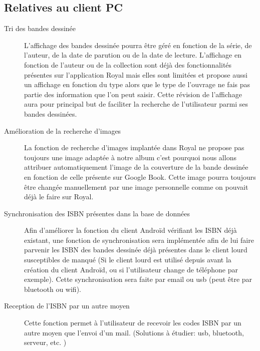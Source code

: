 \subsection{Relatives au client PC}
\begin{description}

\item[Tri des bandes dessinée]
	L'affichage des bandes dessinée pourra être géré en fonction de la série, de l'auteur, de la date de parution ou de la date de lecture. 
	L'affichage en fonction de l'auteur ou de la collection sont déjà des fonctionnalités présentes sur l'application Royal mais elles sont limitées et propose aussi un affichage en fonction du type alors que le type de l'ouvrage ne fais pas partie des information que l'on peut saisir. 
	Cette révision de l'affichage aura pour principal but de faciliter la recherche de l'utilisateur parmi ses bandes dessinées.

\item[Amélioration de la recherche d'images]
	La fonction de recherche d'images implantée dans Royal ne propose pas toujours une image adaptée à notre album c'est pourquoi nous allons attribuer automatiquement l'image de la couverture de la bande dessinée en fonction de celle présente sur Google Book. 
	Cette image pourra toujours être changée manuellement par une image personnelle comme on pouvait déjà le faire sur Royal.

\item[Synchronisation des ISBN présentes dans la base de données]
	Afin d'améliorer la fonction du client Androïd vérifiant les ISBN déjà existant, 
	une fonction de synchronisation sera implémentée afin de lui faire parvenir les ISBN des bandes dessinée déjà présentes dans le client lourd susceptibles de manqué 
	(Si le client lourd est utilisé depuis avant la création du client Androïd, ou si l'utilisateur change de téléphone par exemple). 
	Cette synchronisation sera faite par email ou usb (peut être par bluetooth ou wifi).

\item[Reception de l'ISBN par un autre moyen]
	Cette fonction permet à l'utilisateur de recevoir les codes ISBN par un autre moyen que l'envoi d'un mail. 
	(Solutions à étudier: usb, bluetooth, serveur, etc. )

\end{description}

